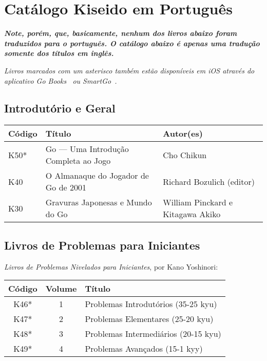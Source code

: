 \chapter{Catálogo Kiseido em Português}\label{ap:pt}

\textbf{\emph{Note, porém, que, basicamente, nenhum dos livros abaixo foram traduzidos para o português. O catálogo abaixo é apenas uma tradução somente dos títulos em inglês.}}

\bigskip

\emph{Livros marcados com um asterisco também estão disponíveis em iOS através do aplicativo Go Books~\cite{gobooks} ou SmartGo~\cite{smartgo}.}

\section{Introdutório e Geral}

\begin{longtable}{l|p{50mm}|p{50mm}} 
    \hline
    \textbf{Código} & \textbf{Título} & \textbf{Autor(es)} \\
    \hline \hline
    K50* & Go --- Uma Introdução Completa ao Jogo & Cho Chikun \\
    \hline
    K40 & O Almanaque do Jogador de Go de 2001 & Richard Bozulich (editor) \\
    \hline
    K30 & Gravuras Japonesas e Mundo do Go & William Pinckard e Kitagawa Akiko \\
    \hline
\end{longtable}


\section{Livros de Problemas para Iniciantes}

\emph{Livros de Problemas Nivelados para Iniciantes}, por Kano Yoshinori:

\begin{longtable}{c|c|l} 
    \hline
    \textbf{Código} & \textbf{Volume} & \textbf{Título} \\
    \hline \hline
    K46* & 1 & Problemas Introdutórios (35-25 kyu) \\
    \hline
    K47* & 2 & Problemas Elementares (25-20 kyu) \\
    \hline
    K48* & 3 & Problemas Intermediários (20-15 kyu) \\
    \hline
    K49* & 4 & Problemas Avançados (15-1 kyy) \\
    \hline
\end{longtable}


